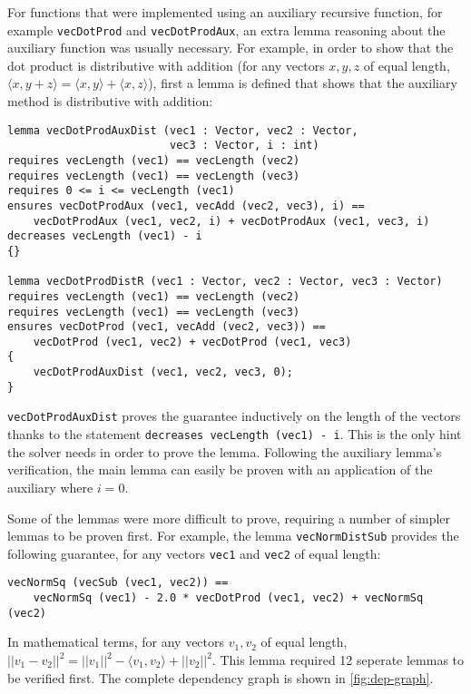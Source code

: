 \documentclass[12pt]{article}
\begin{document}
For functions that were implemented using an auxiliary recursive function, for example \verb|vecDotProd| and \verb|vecDotProdAux|, an extra lemma reasoning about the auxiliary function was usually necessary. For example, in order to show that the dot product is distributive with addition (for any vectors $x, y, z$ of equal length, $\langle x, y + z \rangle = \langle x, y \rangle + \langle x, z \rangle$), first a lemma is defined that shows that the auxiliary method is distributive with addition:

\begin{verbatim}
lemma vecDotProdAuxDist (vec1 : Vector, vec2 : Vector,
                         vec3 : Vector, i : int)
requires vecLength (vec1) == vecLength (vec2)
requires vecLength (vec1) == vecLength (vec3)
requires 0 <= i <= vecLength (vec1)
ensures vecDotProdAux (vec1, vecAdd (vec2, vec3), i) == 
    vecDotProdAux (vec1, vec2, i) + vecDotProdAux (vec1, vec3, i)
decreases vecLength (vec1) - i
{}

lemma vecDotProdDistR (vec1 : Vector, vec2 : Vector, vec3 : Vector)
requires vecLength (vec1) == vecLength (vec2)
requires vecLength (vec1) == vecLength (vec3)
ensures vecDotProd (vec1, vecAdd (vec2, vec3)) == 
    vecDotProd (vec1, vec2) + vecDotProd (vec1, vec3)
{
    vecDotProdAuxDist (vec1, vec2, vec3, 0);
}
\end{verbatim}

\verb|vecDotProdAuxDist| proves the guarantee inductively on the length of the vectors thanks to the statement \verb|decreases vecLength (vec1) - i|. This is the only hint the solver needs in order to prove the lemma. Following the auxiliary lemma's verification, the main lemma can easily be proven with an application of the auxiliary where $i = 0$.

Some of the lemmas were more difficult to prove, requiring a number of simpler lemmas to be proven first. For example, the lemma \verb|vecNormDistSub| provides the following guarantee, for any vectors \verb|vec1| and \verb|vec2| of equal length:
\begin{verbatim}
vecNormSq (vecSub (vec1, vec2)) == 
    vecNormSq (vec1) - 2.0 * vecDotProd (vec1, vec2) + vecNormSq (vec2)
\end{verbatim}
In mathematical terms, for any vectors $v_1, v_2$ of equal length, $||v_1 - v_2||^2 = ||v_1||^2 - \langle v_1, v_2 \rangle + ||v_2||^2$. This lemma required 12 seperate lemmas to be verified first. The complete dependency graph is shown in \autoref{fig:dep-graph}.
\end{document}
